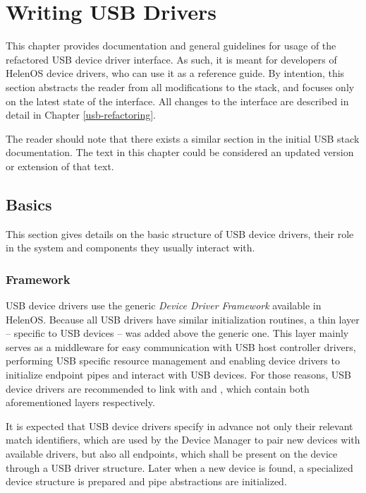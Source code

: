 \chapter{Writing USB Drivers}

This chapter provides documentation and general guidelines for usage of the
refactored USB device driver interface. As such, it is meant for developers of
HelenOS device drivers, who can use it as a reference guide. By intention, this
section abstracts the reader from all modifications to the stack, and focuses
only on the latest state of the interface. All changes to the interface are
described in detail in Chapter \ref{usb-refactoring}.

The reader should note that there exists a similar section in the initial USB
stack documentation. The text in this chapter could be considered an updated
version or extension of that text.


\section{Basics}

This section gives details on the basic structure of USB device drivers, their
role in the system and components they usually interact with.


\subsection{Framework}

USB device drivers use the generic \textit{Device Driver Framework} available in
HelenOS. Because all USB drivers have similar initialization routines, a thin
layer -- specific to USB devices -- was added above the generic one. This layer
mainly serves as a middleware for easy communication with USB host controller
drivers, performing USB specific resource management and enabling device drivers
to initialize endpoint pipes and interact with USB devices. For those reasons,
USB device drivers are recommended to link with  and
, which contain both aforementioned layers respectively.

It is expected that USB device drivers specify in advance not only their
relevant match identifiers, which are used by the Device Manager to pair new
devices with available drivers, but also all endpoints, which shall be present
on the device through a USB driver structure. Later when a new device is found,
a specialized device structure is prepared and pipe abstractions are
initialized.

